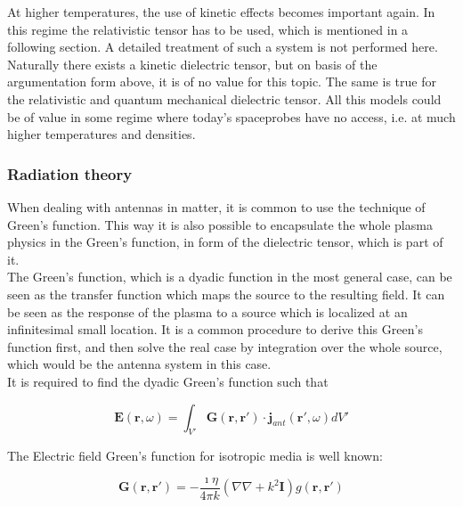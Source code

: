 \documentclass[draft,ras]{agutex}
\begin{document}
\begin{article}
At higher temperatures, the use of kinetic effects becomes important again. In this regime the relativistic tensor has to be used, which is mentioned in a following section. A detailed treatment of such a system is not performed here.\\

Naturally there exists a kinetic dielectric tensor, but on basis of the argumentation form above, it is of no value for this topic. The same is true for the relativistic and quantum mechanical dielectric tensor. All this models could be of value in some regime where today's spaceprobes have no access, i.e. at much higher temperatures and densities. \\

\subsubsection{Radiation theory}
When dealing with antennas in matter, it is common to use the technique of Green's function. This way it is also possible to encapsulate the whole plasma physics in the Green's function, in form of the dielectric tensor, which is part of it.\\

The Green's function, which is a dyadic function in the most general case, can be seen as the transfer function which maps the source to the resulting field. It can be seen as the response of the plasma to a source which is localized at an infinitesimal small location. It is a common procedure to derive this Green's function first, and then solve the real case by integration over the whole source, which would be the antenna system in this case.\\

 It is required to find the dyadic Green's function such that

\begin{equation}
    \mathbf{E}(\mathbf{r},\omega)=\int_{V'} \mathbf{G}(\mathbf{r},\mathbf{r'})\cdot \mathbf{j}_{ant}(\mathbf{r'},\omega) dV'\label{def_greens_function}
\end{equation}

The Electric field Green's function for isotropic media is well known:

\begin{equation}
 \mathbf{G}(\mathbf{r},\mathbf{r'}) = -\frac{\imath \eta }{4 \pi k} \left(  \nabla  \nabla   + k^2  \mathbf{I} \right) g(\mathbf{r},\mathbf{r'})
\end{equation}


\end{article}
\end{document}
